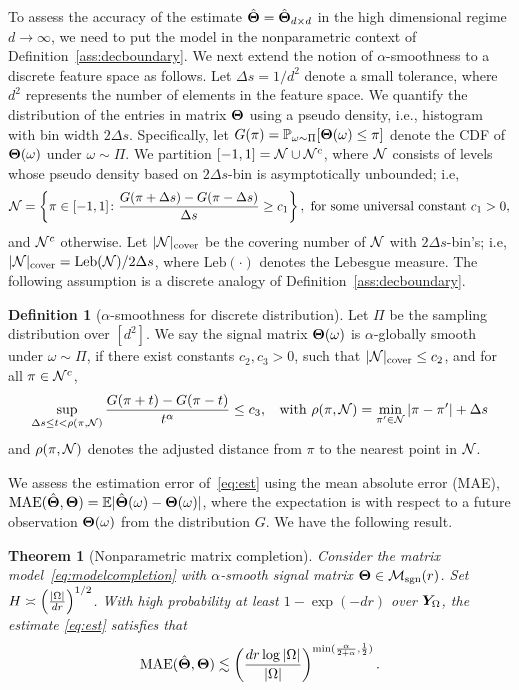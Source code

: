 \documentclass[11pt]{article}
\theoremstyle{plain}
\newtheorem{thm}{Theorem}[section]
\theoremstyle{definition}
\newtheorem{defn}{Definition}
\def\caliM{\tM_{\textup{sgn}}}
\def\caliM{\tM_{\textup{sgn}}}
\begin{document}
\noindent
To assess the accuracy of the estimate $\hat {\bm{\Theta}}=\hat {\bm{\Theta}}_{d\times d}$ in the high dimensional regime $d\to \infty$, we need to put the model in the nonparametric context of Definition~\ref{ass:decboundary}. We next extend the notion of $\alpha$-smoothness to a discrete feature space as follows. Let $\Delta s = 1/d^2$ denote a small tolerance, where $d^2$ represents the number of elements in the feature space. We quantify the distribution of the entries in matrix $\bm{\Theta}$ using a pseudo density, i.e., histogram with bin width $2\Delta s$. Specifically, let $G(\pi)=\mathbb{P}_{\omega\sim \Pi}[\bm{\Theta}(\omega)\leq \pi]$ denote the CDF of $\bm{\Theta}(\omega)$ under $\omega\sim \Pi$. We partition $[-1,1]=\mathcal{N} \cup \mathcal{N}^c$, where $\mathcal{N}$ consists of levels whose pseudo density based on $2\Delta s$-bin is asymptotically unbounded; i.e,
\[
\mathcal{N}=\left\{\pi\in[-1,1] \colon {G(\pi+{\Delta s})-G(\pi-{\Delta s})\over \Delta s} \geq c_1 \right\},\ \text{for some universal constant }c_1>0,
\]
and $\mathcal{N}^c$ otherwise. Let $|\mathcal{N}|_{\text{cover}}$ be the covering number of $\mathcal{N}$ with $2\Delta s$-bin's; i.e, $|\mathcal{N}|_{\text{cover}} =\text{Leb}(\mathcal{N})/2\Delta s$, where $\text{Leb}(\cdot)$ denotes the Lebesgue measure. The following assumption is a discrete analogy of Definition~\ref{ass:decboundary}.

\begin{defn}[$\alpha$-smoothness for discrete distribution] Let $\Pi$ be the sampling distribution over $[d^2]$. We say the signal matrix $\bm{\Theta}(\omega)$ is $\alpha$-globally smooth under $\omega\sim \Pi$, if there exist constants $c_2,c_3>0$, such that $|\mathcal{N}|_{\text{cover}}\leq c_2$, and for all $\pi \in\mathcal{N}^c$, 
\begin{equation*} \label{eq:smooth}
\sup_{\Delta s \leq t<\rho(\pi, \mathcal{N})}{G(\pi+{t})-G(\pi-{t})\over t^\alpha} \leq c_3, \;\; \text{ with } \rho(\pi,\mathcal{N})=\min_{\pi'\in \mathcal{N}}|\pi-\pi'|+\Delta s 
\end{equation*}
and $\rho(\pi,\mathcal{N})$ denotes the adjusted distance from $\pi$ to the nearest point in $\mathcal{N}$. 
\end{defn}
We assess the estimation error of~\eqref{eq:est} using the mean absolute error (MAE), $\text{MAE}(\hat {\bm{\Theta}}, \bm{\Theta}) = \mathbb{E}|\hat {\bm{\Theta}}(\omega)-\bm{\Theta}(\omega)|$, where the expectation is with respect to a future observation $\bm{\Theta}(\omega)$ from the distribution $G$.  We have the following result. 

\begin{thm}[Nonparametric matrix completion]\label{thm:estimation} 
Consider the matrix model~\eqref{eq:modelcompletion} with $\alpha$-smooth signal matrix $\mTheta\in\caliM(r)$. Set $H \asymp \left( |\Omega|\over dr\right)^{1/2}$. With high probability at least $1-\exp(-dr)$ over $\bm Y_\Omega$, the estimate \eqref{eq:est} satisfies that
\begin{equation}\label{eq:real}
\textup{MAE}(\hat {\bm{\Theta}}, \bm{\Theta})\lesssim \left(dr \log|\Omega| \over |\Omega|\right)^{\min({\alpha \over 2+\alpha}, {1\over 2})}.
\end{equation}
\end{thm}
\end{document}
